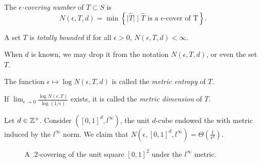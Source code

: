\documentclass[11pt]{article}
\begin{document}
\begin{definition}
  The \emph{$\epsilon$-covering number} of $T\subset S$ is
  \begin{equation*}
    N(\epsilon, T, d) = \min\left\{
    \big|\widehat{T}\big| \mid \widehat{T}\text{ is a }\epsilon\text{-cover of T}
    \right\}.
  \end{equation*}
\end{definition}

\begin{definition}
  A set $T$ is \emph{totally bounded} if for all $\epsilon > 0$, $N(\epsilon, T, d) < \infty$. 
\end{definition}
When $d$ is known, we may drop it from the notation $N(\epsilon, T, d)$, or even the set $T$.
\begin{definition}
  The function $\epsilon \mapsto \log{N(\epsilon, T, d)}$ is called the \emph{metric entropy} of $T$.
\end{definition}
\begin{definition}
  If $\lim_{\epsilon \to 0} \frac{\log{N(\epsilon, T)}}{\log(1/\epsilon)}$ exists, it is called the
  \emph{metric dimension} of $T$.
\end{definition}

\begin{example}
  Let $d \in \mathbb{Z}^+$.
  Consider $([0,1]^d, l^\infty)$, the unit $d$-cube endowed the with metric
  induced by the $l^\infty$ norm. We claim that $N(\epsilon, [0,1]^d, l^\infty)
  = \Theta\left(\frac{1}{\epsilon^d}\right)$.
\end{example}

\begin{figure}[ht]
  \centering
\caption{A $.2$-covering of the unit square $[0,1]^2$ under the $l^\infty$ metric.}
  \label{fig:2}
\end{figure}
\end{document}

